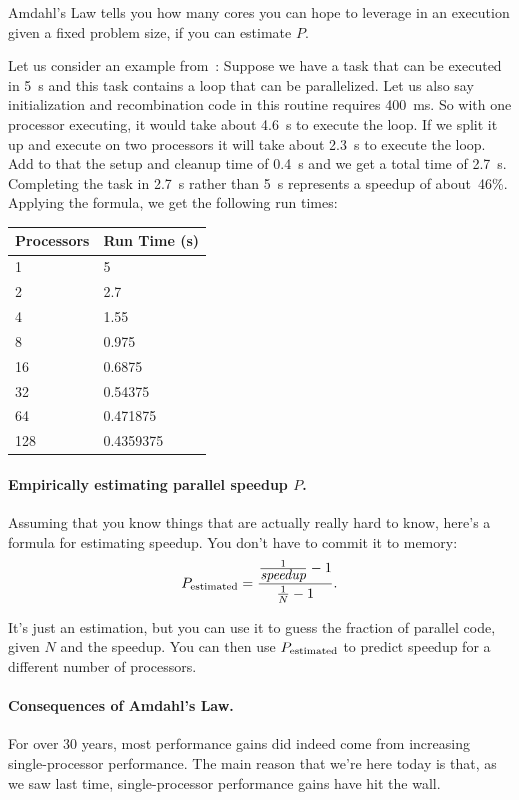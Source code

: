 \documentclass[a4paper]{report}
\begin{document}
Amdahl's Law tells you how many cores you can hope to leverage in an
execution given a fixed problem size, if you can estimate $P$.

Let us consider an example from~\cite{mte241}: Suppose we have a task that can be executed in 5~s and this task contains a loop that can be parallelized. Let us also say initialization and recombination code in this routine requires 400~ms. So with one processor executing, it would take about 4.6~s to execute the loop. If we split it up and execute on two processors it will take about 2.3~s to execute the loop. Add to that the setup and cleanup time of 0.4~s and we get a total time of 2.7~s. Completing the task in 2.7~s rather than 5~s represents a speedup of about~46\%. Applying the formula, we get the following run times:

\begin{center}
	\begin{tabular}{l|l}
	\textbf{Processors} & \textbf{Run Time (s)} \\ \hline
	1 & 5\\
	2 & 2.7\\
	4 & 1.55\\
	8 & 0.975\\
	16 & 0.6875 \\
	32 & 0.54375 \\
	64 & 0.471875 \\
	128 & 0.4359375\\
	\end{tabular}
\end{center}

   \paragraph{Empirically estimating parallel speedup $P$.}
Assuming that you know things that are actually really hard to know, here's a formula for estimating speedup. You don't have to commit it to memory:
  \[P_{\mbox{\scriptsize estimated}} = \frac{\frac{1}{\mbox{\em speedup}}-1}{\frac{1}{N}-1}.\]

It's just an estimation, but you can use it to guess the fraction of parallel code, given $N$ and the speedup. You can then use $P_{\mbox{\scriptsize estimated}}$ to predict speedup for a different number of processors.

\paragraph{Consequences of Amdahl's Law.}
For over 30 years, most performance gains did indeed come from
increasing single-processor performance. The main reason that we're
here today is that, as we saw last time,
single-processor performance gains have hit the wall.
\end{document}
